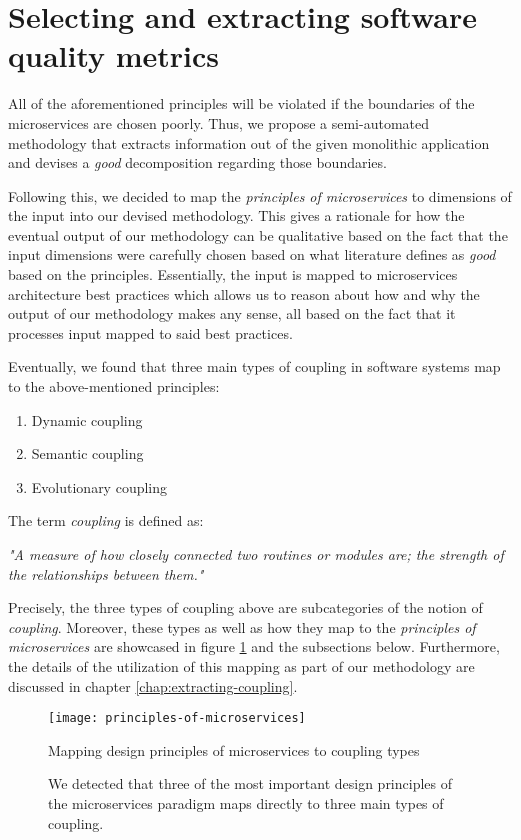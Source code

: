 \documentclass[12pt,a4paper]{report}
\begin{document}
\section{Selecting and extracting software quality metrics} \label{sect:software-quality-metrics}

All of the aforementioned principles will be violated if the boundaries of the
microservices are chosen poorly. Thus, we propose a semi-automated methodology
that extracts information out of the given monolithic application and devises
a \textit{good} decomposition regarding those boundaries.

Following this, we decided to map the \textit{principles of microservices} to
dimensions of the input into our devised methodology.
This gives a rationale for how the eventual output of our methodology can
be qualitative based on the fact that the input dimensions were carefully
chosen based on what literature defines as \textit{good} based on the principles.
Essentially, the input is mapped to microservices architecture best practices
which allows us to reason about how and why the output of our methodology
makes any sense, all based on the fact that it processes input mapped to said
best practices.

Eventually, we found that three main types of coupling in software systems map
to the above-mentioned principles:
\begin{enumerate}
  \item Dynamic coupling
  \item Semantic coupling
  \item Evolutionary coupling
\end{enumerate}
The term \textit{coupling} is defined as:
\begin{displayquote}
\emph{"A measure of how closely connected two routines or modules are;
the strength of the relationships between them."}~\cite{swebok}
\end{displayquote}
Precisely, the three types of coupling above are subcategories of the notion of
\textit{coupling}. Moreover, these types as well as how they map to the
\textit{principles of microservices} are showcased in figure
\ref{fig:principles-of-microservices} and the subsections below.
Furthermore, the details of the utilization
of this mapping as part of our methodology are discussed in chapter
\ref{chap:extracting-coupling}.

\begin{figure}[htbp]
\centering
\texttt{[image: principles-of-microservices]}
\caption{Mapping design principles of microservices to coupling types}
\caption*{
  We detected that three of the most important design principles of the
  microservices paradigm maps directly to three main types of coupling.
}
\label{fig:principles-of-microservices}
\end{figure}
\end{document}
